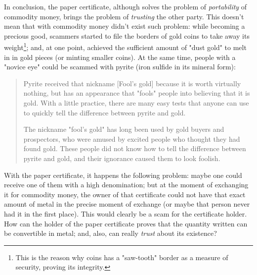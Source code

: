 \documentclass[12pt,a4paper,twoside]{book}
\begin{document}
In conclusion, the paper certificate, although solves the problem of \textit{portability} of commodity money, brings the problem of \textit{trusting} the other party. This doesn't mean that with commodity money didn't exist such problem: while becoming a precious good, scammers started to file the borders of gold coins to take away its weight\footnote{This is the reason why coins has a "saw-tooth" border as a measure of security, proving its integrity.}; and, at one point, achieved the sufficient amount of "dust gold" to melt in in gold pieces (or minting smaller coins). At the same time, people with a "novice eye" could be scammed with pyrite (iron sulfide in its mineral form):

\begin{quotation}
Pyrite received that nickname [Fool's gold] because it is worth virtually nothing, but has an appearance that "fools" people into believing that it is gold. With a little practice, there are many easy tests that anyone can use to quickly tell the difference between pyrite and gold.

The nickname "fool's gold" has long been used by gold buyers and prospectors, who were amused by excited people who thought they had found gold. These people did not know how to tell the difference between pyrite and gold, and their ignorance caused them to look foolish. \cite{iron-sulfide}
\end{quotation}

With the paper certificate, it happens the following problem: maybe one could receive one of them with a high denomination; but at the moment of exchanging it for commodity money, the owner of that certificate could not have that exact amount of metal in the precise moment of exchange (or maybe that person never had it in the first place). This would clearly be a scam for the certificate holder. How can the holder of the paper certificate proves that the quantity written can be convertible in metal; and, also, can really \textit{trust} about its existence?
\end{document}
